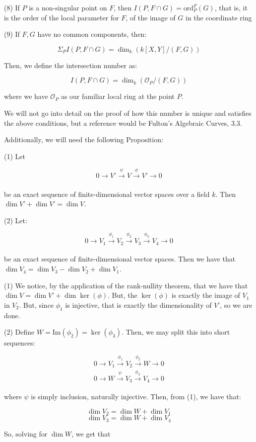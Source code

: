 \documentclass[10pt]{article}
\begin{document}
(8) If $P$ is a non-singular point on $F$, then $I(P, F \cap G) = \text{ord}_P^F(G)$, that is, it is the order of the local parameter for $F$, of the image of $G$ in the coordinate ring

(9) If $F,G$ have no common components, then:

$$ \Sigma_P  I(P,F \cap G) = \dim_k(k[X,Y]/(F,G)) $$

Then, we define the intersection number as:

$$ I(P,F \cap G) = \dim_k(\mathcal{O}_P/(F,G)) $$

where we have $\mathcal{O}_P$ as our familiar local ring at the point $P$.

We will not go into detail on the proof of how this number is unique and satisfies the above conditions, but a reference would be Fulton’s Algebraic Curves, 3.3.

Additionally, we will need the following Proposition:

(1) Let 

$$ 0 \to V’ \xrightarrow[]{\psi} V  \xrightarrow[]{\phi} V’ \to 0 $$

be an exact sequence of finite-dimensional vector spaces over a field $k$. Then $\dim V’ + \dim V’= \dim V$.

(2) Let:

$$ 0 \to V_1 \xrightarrow[]{\phi_1} V_2 \xrightarrow[]{\phi_2} V_3 \xrightarrow[]{\phi_3} V_4 \to 0 $$

be an exact sequence of finite-dimensional vector spaces. Then we have that $\dim V_4 = \dim V_3 - \dim V_2 + \dim V_1$.

(1) We notice, by the application of the rank-nullity theorem, that we have that $\dim V = \dim V’ + \dim \ker(\phi)$. But, the $\ker(\phi)$ is exactly the image of $V_1$ in $V_2$. But, since $\phi_1$ is injective, that is exactly the dimensionality of $V’$, so we are done.

(2) Define $W = \text{Im}(\phi_2) = \ker(\phi_3)$. Then, we may split this into short sequences:

$$ 0 \to  V_1 \xrightarrow[]{\phi_1} V_2 \xrightarrow[]{\phi_2} W \to 0 $$
$$ 0 \to W \xrightarrow[]{\psi} V_3  \xrightarrow[]{\phi_3} V_4 \to 0 $$

where $\psi$ is simply inclusion, naturally injective. Then, from (1), we have that:

$$\dim V_2 = \dim W + \dim V_1$$
$$ \dim V_3 = \dim W + \dim V_4$$

So, solving for $\dim W$, we get that
\end{document}

